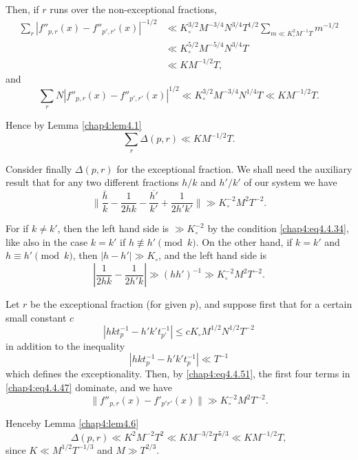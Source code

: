 Then, if $r$ runs over the non-exceptional fractions,
\begin{align*}
\sum\limits_r\left|f''_{p,r}(x)-f''_{p',r'}(x)\right|^{-1/2} &\ll K_\circ^{3/2} M^{-3/4}N^{3/4}T^{1/2}\sum\limits_{m\ll K_\circ^2M^{-1}T}m^{-1/2}\\
&\ll K_\circ^{5/2}M^{-5/4}N^{3/4}T\\
&\ll KM^{-1/2}T,
\end{align*}
and\pageoriginale
$$
\sum\limits_rN\left|f''_{p,r}(x)-f''_{p',r'}(x)\right|^{1/2}\ll K_\circ^{3/2}M^{-3/4}N^{1/4}T\ll KM^{-1/2}T.
$$

Hence by Lemma \ref{chap4:lem4.1}
\begin{equation}\label{chap4:eq4.4.50}
\sum\limits_r\Delta(p,r)\ll KM^{-1/2}T.
\end{equation}

Consider finally $\Delta(p,r)$ for the exceptional fraction. We shall need the auxiliary result that for any two different fractions $h/k$ and $h'/k'$ of our system we have 
\begin{equation}\label{chap4:eq4.4.51}
\parallel\frac{\bar{h}}{k}-\frac{1}{2hk}-\frac{\overline{h'}}{k'}+\frac{1}{2h'k'} \parallel\gg K_\circ^{-2}M^2T^{-2}.
\end{equation}

For if $k\neq k'$, then the left hand side is $\gg K_\circ^{-2}$ by the condition \eqref{chap4:eq4.4.34}, like also in the case $k=k'$ if $h\nequiv h'\pmod k$. On the other hand, if $k=k'$ and $h\equiv h'\pmod k$, then $|h-h'|\gg K_\circ$, and the left hand side is
$$
\left|\frac{1}{2hk}-\frac{1}{2h'k}\right|\gg(hh')^{-1}\gg K_\circ^{-2}M^2 T^{-2}.
$$
 
Let $r$ be the exceptional fraction (for given $p$), and suppose first that for a certain small constant $c$ 
\begin{equation}\label{chap4:eq4.4.52}
\left|hkt_p^{-1}-h'k't_{p'}^{-1}\right|\leq cK_\circ M^{1/2}N^{1/2}T^{-2}
\end{equation}
in addition to the inequality
\begin{equation}\label{chap4:eq4.4.53}
\left|hkt_p^{-1}-h'k't_p^{-1}\right|\ll T^{-1}
\end{equation}
which defines the exceptionality. Then, by \eqref{chap4:eq4.4.51}, the first four terms in \eqref{chap4:eq4.4.47} dominate, and we have 
$$
\parallel f''_{p,r}(x)-f'_{p'r'}(x)\parallel\gg K_\circ^{-2}M^2T^{-2}.
$$

Hence\pageoriginale by Lemma \ref{chap4:lem4.6}
$$
\Delta(p,r)\ll K^2M^{-2}T^2\ll KM^{-3/2}T^{5/3}\ll KM^{-1/2}T,
$$
since $K\ll M^{1/2}T^{-1/3}$ and $M\gg T^{2/3}$.


